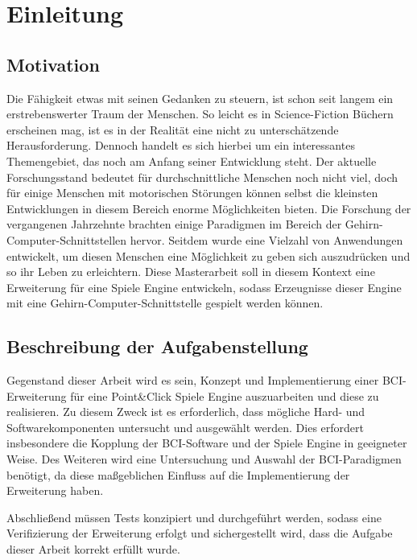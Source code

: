 \chapter{Einleitung}

\section{Motivation}

Die Fähigkeit etwas mit seinen Gedanken zu steuern, ist schon seit langem ein erstrebenswerter Traum der Menschen.
So leicht es in Science-Fiction Büchern erscheinen mag, ist es in der Realität eine nicht zu unterschätzende Herausforderung.
Dennoch handelt es sich hierbei um ein interessantes Themengebiet, das noch am Anfang seiner Entwicklung steht.
Der aktuelle Forschungsstand bedeutet für durchschnittliche Menschen noch nicht viel, doch für einige Menschen mit motorischen Störungen können selbst die kleinsten Entwicklungen in diesem Bereich enorme Möglichkeiten bieten.
Die Forschung der vergangenen Jahrzehnte brachten einige Paradigmen im Bereich der Gehirn-Computer-Schnittstellen hervor.
Seitdem wurde eine Vielzahl von Anwendungen entwickelt, um diesen Menschen eine
Möglichkeit zu geben sich auszudrücken und so ihr Leben zu erleichtern.
Diese Masterarbeit soll in diesem Kontext eine Erweiterung für eine Spiele Engine entwickeln, sodass Erzeugnisse dieser Engine mit eine Gehirn-Computer-Schnittstelle gespielt werden können.\\







\section{Beschreibung der Aufgabenstellung}

Gegenstand dieser Arbeit wird es sein, Konzept und Implementierung einer \acs{BCI}-Erweiterung für eine Point\&\-Click Spiele Engine auszuarbeiten und diese zu realisieren.
Zu diesem Zweck ist es erforderlich, dass mögliche Hard- und Softwarekomponenten untersucht und ausgewählt werden.
Dies erfordert insbesondere die Kopplung der \acs{BCI}-Software und der Spiele Engine in geeigneter Weise.
Des Weiteren wird eine Untersuchung und Auswahl der \acs{BCI}-Paradigmen benötigt, da diese maßgeblichen Einfluss auf die Implementierung der Erweiterung haben.


Abschließend müssen Tests konzipiert und durchgeführt werden, sodass eine Verifizierung der Erweiterung erfolgt und sichergestellt wird, dass die Aufgabe dieser Arbeit korrekt erfüllt wurde.\\




